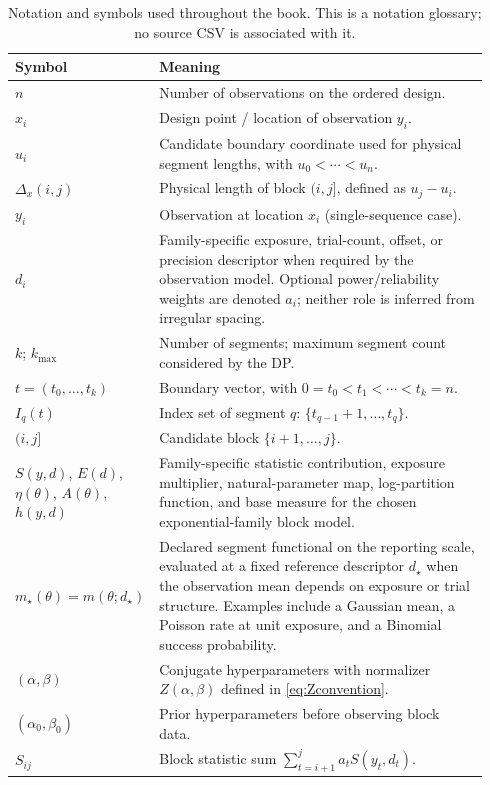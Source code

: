 \begin{longtable}{@{}p{0.22\linewidth}p{0.72\linewidth}@{}}
\caption[Notation and symbols]{Notation and symbols used throughout the book. This is a notation glossary; no source CSV is associated with it.}\label{tab:notation}\\
\toprule
\textbf{Symbol} & \textbf{Meaning} \\
\midrule
$n$ & Number of observations on the ordered design. \\
$x_i$ & Design point / location of observation $y_i$. \\
$u_i$ & Candidate boundary coordinate used for physical segment lengths, with $u_0<\cdots<u_n$. \\
$\Delta_x(i,j)$ & Physical length of block $(i,j]$, defined as $u_j-u_i$. \\
$y_i$ & Observation at location $x_i$ (single-sequence case). \\
$d_i$ & Family-specific exposure, trial-count, offset, or precision descriptor when required by the observation model. Optional power/reliability weights are denoted $a_i$; neither role is inferred from irregular spacing. \\
\midrule
$k$; $k_{\max}$ & Number of segments; maximum segment count considered by the DP. \\
$t=(t_0,\dots,t_k)$ & Boundary vector, with $0=t_0<t_1<\cdots<t_k=n$. \\
$I_q(t)$ & Index set of segment $q$: $\{t_{q-1}+1,\dots,t_q\}$. \\
$(i,j]$ & Candidate block $\{i+1,\dots,j\}$. \\
\midrule
$S(y,d)$, $E(d)$, $\eta(\theta)$, $A(\theta)$, $h(y,d)$ & Family-specific statistic contribution, exposure multiplier, natural-parameter map, log-partition function, and base measure for the chosen exponential-family block model. \\
$m_\star(\theta)=m(\theta;d_\star)$ & Declared segment functional on the reporting scale, evaluated at a fixed reference descriptor $d_\star$ when the observation mean depends on exposure or trial structure. Examples include a Gaussian mean, a Poisson rate at unit exposure, and a Binomial success probability. \\
\midrule
$(\alpha,\beta)$ & Conjugate hyperparameters with normalizer $Z(\alpha,\beta)$ defined in \eqref{eq:Zconvention}. \\
$(\alpha_0,\beta_0)$ & Prior hyperparameters before observing block data. \\
\midrule
$S_{ij}$ & Block statistic sum $\sum_{t=i+1}^j a_t S(y_t,d_t)$. \\

\end{longtable}
